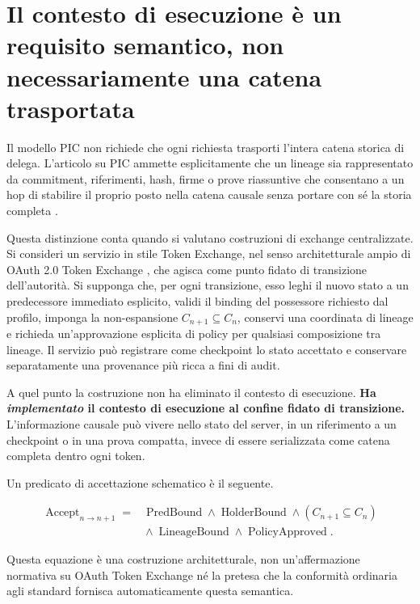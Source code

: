 \documentclass[10pt,oneside,openany]{book}
\begin{document}
\section{Il contesto di esecuzione è un requisito semantico, non necessariamente una catena trasportata}
Il modello PIC non richiede che ogni richiesta trasporti l'intera catena storica di delega. L'articolo su PIC ammette esplicitamente che un lineage sia rappresentato da commitment, riferimenti, hash, firme o prove riassuntive che consentano a un hop di stabilire il proprio posto nella catena causale senza portare con sé la storia completa \cite{gallo2026pic}.

Questa distinzione conta quando si valutano costruzioni di exchange centralizzate. Si consideri un servizio in stile Token Exchange, nel senso architetturale ampio di OAuth 2.0 Token Exchange \cite{rfc8693}, che agisca come punto fidato di transizione dell'autorità. Si supponga che, per ogni transizione, esso leghi il nuovo stato a un predecessore immediato esplicito, validi il binding del possessore richiesto dal profilo, imponga la non-espansione $C_{n+1}\subseteq C_n$, conservi una coordinata di lineage e richieda un'approvazione esplicita di policy per qualsiasi composizione tra lineage. Il servizio può registrare come checkpoint lo stato accettato e conservare separatamente una provenance più ricca a fini di audit.

A quel punto la costruzione non ha eliminato il contesto di esecuzione. \textbf{Ha \emph{implementato} il contesto di esecuzione al confine fidato di transizione.} L'informazione causale può vivere nello stato del server, in un riferimento a un checkpoint o in una prova compatta, invece di essere serializzata come catena completa dentro ogni token.

Un predicato di accettazione schematico è il seguente.
\begin{formulabox}
\[
\begin{aligned}
\operatorname{Accept}_{n\rightarrow n+1} ={}&
\operatorname{PredBound}\land\operatorname{HolderBound}\land
(C_{n+1}\subseteq C_n)\\
&{}\land\operatorname{LineageBound}\land\operatorname{PolicyApproved}.
\end{aligned}
\]
\end{formulabox}
Questa equazione è una costruzione architetturale, non un'affermazione normativa su OAuth Token Exchange né la pretesa che la conformità ordinaria agli standard fornisca automaticamente questa semantica.
\end{document}
